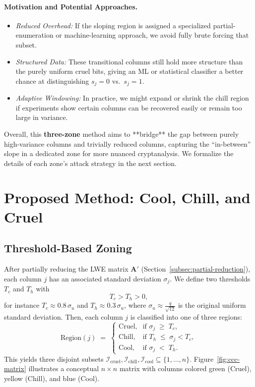 \documentclass[11pt]{article}
\begin{document}
\paragraph{Motivation and Potential Approaches.}
\begin{itemize}
    \item \emph{Reduced Overhead:} If the sloping region is assigned a specialized partial-enumeration or machine-learning approach, we avoid fully brute forcing that subset.
    \item \emph{Structured Data:} These transitional columns still hold more structure than the purely uniform cruel bits, giving an ML or statistical classifier a better chance at distinguishing $s_j=0$ vs.\ $s_j=1$.
    \item \emph{Adaptive Windowing:} In practice, we might expand or shrink the chill region if experiments show certain columns can be recovered easily or remain too large in variance.
\end{itemize}

Overall, this \textbf{three-zone} method aims to **bridge** the gap between purely high-variance columns and trivially reduced columns, capturing the “in-between” slope in a dedicated zone for more nuanced cryptanalysis. We formalize the details of each zone’s attack strategy in the next section.

\section{Proposed Method: \texorpdfstring{Cool, Chill, and Cruel}{Cool, Chill, and Cruel}}
\label{sec:proposed-ccc}

\subsection{Threshold-Based Zoning}
\label{subsec:threshold-zoning}

After partially reducing the LWE matrix $\mathbf{A}'$ (Section~\ref{subsec:partial-reduction}), each column $j$ has an associated standard deviation $\sigma_j$. We define two thresholds $T_c$ and $T_h$ with 
\[
  T_c > T_h > 0,
\]
for instance $T_c \approx 0.8 \,\sigma_u$ and $T_h \approx 0.3\, \sigma_u$, where $\sigma_u \approx \frac{q}{\sqrt{12}}$ is the original uniform standard deviation. Then, each column $j$ is classified into one of three regions:
\[
  \mathrm{Region}(j) \;=\;
  \begin{cases}
    \text{Cruel}, & \text{if } \sigma_j \;\ge\; T_c,\\
    \text{Chill}, & \text{if } T_h \;\le\; \sigma_j < T_c,\\
    \text{Cool}, & \text{if } \sigma_j \;<\; T_h.
  \end{cases}
\]
This yields three disjoint subsets $\mathcal{I}_{\mathrm{cruel}}, \mathcal{I}_{\mathrm{chill}}, \mathcal{I}_{\mathrm{cool}} \subseteq \{1,\ldots,n\}$. Figure~\ref{fig:ccc-matrix} illustrates a conceptual $n\times n$ matrix with columns colored green (Cruel), yellow (Chill), and blue (Cool).
\end{document}
